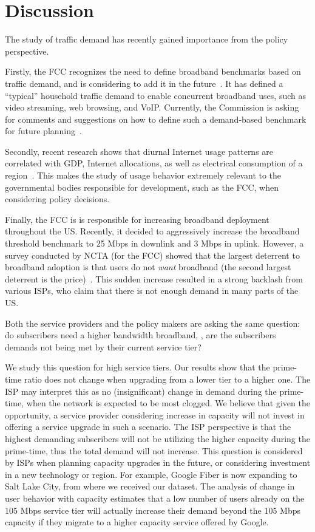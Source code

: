 \section{Discussion}\label{sec:discussion}

The study of traffic demand has recently gained importance from the policy 
perspective. 

Firstly, the FCC recognizes the need to define broadband benchmarks based on 
traffic demand, and is considering to add it in the 
future~\cite{fcc2015broadband-report}. It has defined a ``typical'' household 
traffic demand to enable concurrent broadband uses, such as video streaming, 
web 
browsing, and VoIP. Currently, the Commission is asking for comments and 
suggestions on how to define such a demand-based benchmark for future 
planning~\cite{fcc2015progress-report, fcc2014progress-report}.

Secondly, recent research shows that diurnal Internet usage patterns are 
correlated with GDP, Internet allocations, as well as electrical consumption of 
a region~\cite{ant-diurnal-web}. This makes the study of usage behavior 
extremely relevant to the governmental bodies responsible for development, such 
as the FCC, when considering policy decisions.

Finally, the FCC is is responsible for increasing broadband deployment 
throughout the US. Recently, it decided to aggressively increase the 
broadband threshold benchmark to 25 Mbps in downlink and 3 Mbps in uplink. 
However, a survey conducted 
by NCTA (for the FCC) showed that the largest deterrent to broadband adoption 
is that users do not \emph{want} broadband (the second largest deterrent is the 
price)~\cite{fcc2015progress-report}.  This sudden increase 
resulted in a strong backlash from various ISPs, who claim that 
there is not enough demand in many parts of the US.

Both the service providers and the policy makers are asking the same
question: do subscribers need a higher bandwidth broadband, \ie, are the 
subscribers demands not being met by their current service tier?

We study this question for high service tiers. Our results show that the 
prime-time ratio does not change when upgrading from a lower tier to a higher 
one. The ISP may interpret this as no (insignificant) change in demand during 
the prime-time, when the network is expected to be most clogged. We
believe that given the opportunity, a service provider considering increase in 
capacity will not invest in offering a service upgrade in such a scenario. The 
ISP perspective is that the highest demanding subscribers will not be utilizing 
the higher capacity during the prime-time, thus the total demand will not 
increase. This question is considered by ISPs when planning capacity upgrades 
in the future, or considering investment in a new technology or region. For 
example, Google Fiber is now expanding to Salt Lake City, from where 
we received our dataset. The analysis of change in user behavior with capacity 
estimates that a low number of users already on the 105 Mbps service tier will 
actually increase their demand beyond the 105 Mbps capacity if they 
migrate to a higher capacity service offered by Google. 

